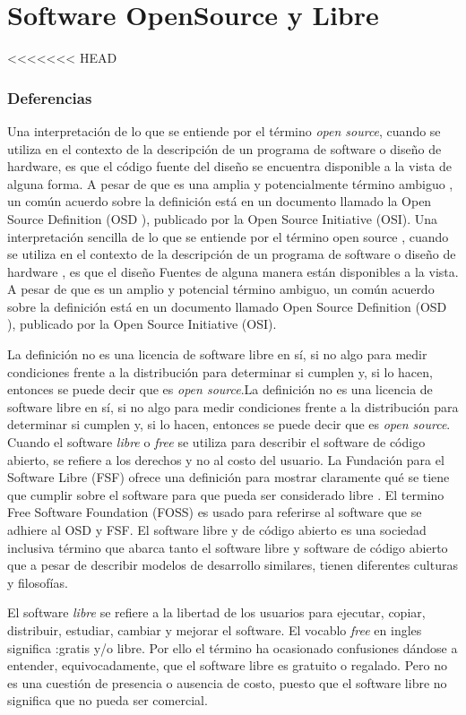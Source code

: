 \chapter{Software OpenSource y Libre}
<<<<<<< HEAD
		\subsection{Deferencias} 
Una interpretación de lo que se entiende por el término \textit{open source}, cuando se utiliza en el contexto de la descripción de un programa de software o diseño de hardware, es que el código fuente del diseño se encuentra disponible a la vista de alguna forma. A pesar de que es una amplia y potencialmente término ambiguo , un común acuerdo sobre la definición está en un documento llamado la Open Source Definition (OSD ), publicado por la Open Source Initiative (OSI).
Una interpretación sencilla de lo que se entiende por el término open source , cuando se utiliza en el contexto de la descripción de un programa de software o diseño de hardware , es que el diseño Fuentes de alguna manera están disponibles a la vista. A pesar de que es un amplio y potencial término ambiguo, un común acuerdo sobre la definición está en un documento llamado  Open Source Definition (OSD ), publicado por la Open Source Initiative (OSI).

La definición no es una licencia de software libre en sí, si no algo para medir condiciones frente a la distribución para determinar si cumplen y, si lo hacen, entonces se puede decir que es \textit{open source}\cite{Etiqueta06}.La definición no es una licencia de software libre en sí, si no algo para medir condiciones frente a la distribución para determinar si cumplen y, si lo hacen, entonces se puede decir que es \textit{open source}. Cuando el software \textit{libre} o \textit{free} se utiliza para describir el software de código abierto, se refiere a los derechos y no al costo del usuario. La Fundación para el Software Libre (FSF) ofrece una definición para mostrar claramente qué se tiene que cumplir sobre el software para que pueda ser considerado libre \cite{Etiqueta07}. El termino Free Software Foundation (FOSS) es usado para referirse al software que se adhiere al OSD y FSF. El software libre y de código abierto es una sociedad inclusiva término que abarca tanto el software libre y software de código abierto que a pesar de describir modelos de desarrollo similares, tienen diferentes culturas y filosofías.

El software \textit{libre} se refiere a la libertad de los usuarios para ejecutar, copiar, distribuir, estudiar, cambiar y mejorar el software. El vocablo \textit{free} en ingles significa :gratis y/o libre. Por ello el término ha ocasionado confusiones dándose a entender, equivocadamente, que el software libre es gratuito o regalado. Pero no es una cuestión de presencia o ausencia de costo, puesto que el software libre no significa que no pueda ser comercial.

